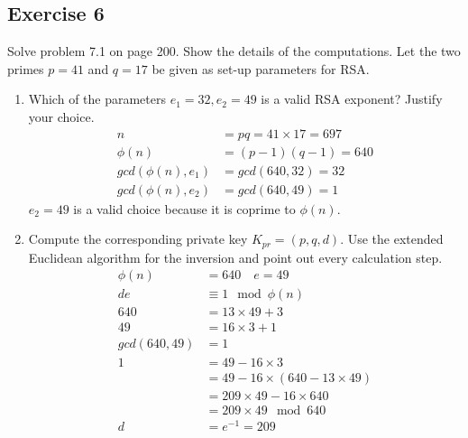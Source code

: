 \documentclass{math}
\begin{document}
\subsection*{Exercise 6}
Solve problem 7.1 on page 200. Show the details of the computations. Let the two
primes \( p = 41 \) and \( q = 17 \) be given as set-up parameters for RSA.
\begin{enumerate}
  \item Which of the parameters \( e_1 = 32, e_2 = 49 \) is a valid RSA
  exponent? Justify your choice.
  \begin{align*}
    n &= pq = 41\times17 = 697 \\
    \phi(n) &= (p-1)(q-1) = 640 \\
    gcd(\phi(n),e_1) &= gcd(640,32) = 32 \\
    gcd(\phi(n),e_2) &= gcd(640,49) = 1
  \end{align*}
  \( e_2 = 49 \) is a valid choice because it is coprime to \( \phi(n) \).
  \item Compute the corresponding private key \( K_{pr} = (p,q,d) \). Use the
  extended Euclidean algorithm for the inversion and point out every
  calculation step.
  \begin{align*}
    \phi(n) &= 640 \quad e = 49 \\
    de &\equiv 1\mod\phi(n) \\
    640 &= 13\times49+3 \\
    49 &= 16\times3+1 \\
    gcd(640,49) &= 1 \\
    1 &= 49-16\times3 \\
    &= 49-16\times(640-13\times49) \\
    &= 209\times49-16\times640 \\
    &= 209\times49\mod640 \\
    d &= e^{-1} = 209
  \end{align*}
\end{enumerate}
\end{document}

